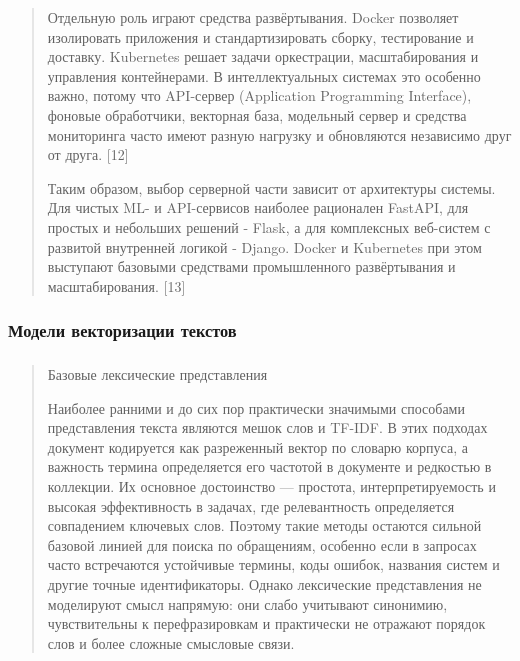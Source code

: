 \documentclass[
]{article}
\begin{document}
\begin{quote}
Отдельную роль играют средства развёртывания. Docker позволяет
изолировать приложения и стандартизировать сборку, тестирование и
доставку. Kubernetes решает задачи оркестрации, масштабирования и
управления контейнерами. В интеллектуальных системах это особенно важно,
потому что API-сервер (Application Programming Interface), фоновые
обработчики, векторная база, модельный сервер и средства мониторинга
часто имеют разную нагрузку и обновляются независимо друг от друга.
{[}12{]}

Таким образом, выбор серверной части зависит от архитектуры системы. Для
чистых ML- и API-сервисов наиболее рационален FastAPI, для простых и
небольших решений - Flask, а для комплексных веб-систем с развитой
внутренней логикой - Django. Docker и Kubernetes при этом выступают
базовыми средствами промышленного развёртывания и масштабирования.
{[}13{]}
\end{quote}

\hypertarget{ux43cux43eux434ux435ux43bux438-ux432ux435ux43aux442ux43eux440ux438ux437ux430ux446ux438ux438-ux442ux435ux43aux441ux442ux43eux432}{%
\subsubsection{Модели векторизации
текстов}\label{ux43cux43eux434ux435ux43bux438-ux432ux435ux43aux442ux43eux440ux438ux437ux430ux446ux438ux438-ux442ux435ux43aux441ux442ux43eux432}}

\hypertarget{section-1}{%
\subsubsection{}\label{section-1}}

\begin{quote}
Базовые лексические представления

Наиболее ранними и до сих пор практически значимыми способами
представления текста являются мешок слов и TF-IDF. В этих подходах
документ кодируется как разреженный вектор по словарю корпуса, а
важность термина определяется его частотой в документе и редкостью в
коллекции. Их основное достоинство --- простота, интерпретируемость и
высокая эффективность в задачах, где релевантность определяется
совпадением ключевых слов. Поэтому такие методы остаются сильной базовой
линией для поиска по обращениям, особенно если в запросах часто
встречаются устойчивые термины, коды ошибок, названия систем и другие
точные идентификаторы. Однако лексические представления не моделируют
смысл напрямую: они слабо учитывают синонимию, чувствительны к
перефразировкам и практически не отражают порядок слов и более сложные
смысловые связи.
\end{quote}
\end{document}
